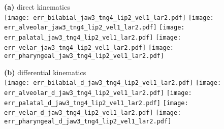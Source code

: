\documentclass[varwidth=7.5in]{standalone}
\begin{document}
\raggedright

{\bf (a)} direct kinematics\\
\texttt{[image: err\_bilabial\_jaw3\_tng4\_lip2\_vel1\_lar2.pdf]}%
\texttt{[image: err\_alveolar\_jaw3\_tng4\_lip2\_vel1\_lar2.pdf]}%
\texttt{[image: err\_palatal\_jaw3\_tng4\_lip2\_vel1\_lar2.pdf]}%
\texttt{[image: err\_velar\_jaw3\_tng4\_lip2\_vel1\_lar2.pdf]}%
\texttt{[image: err\_pharyngeal\_jaw3\_tng4\_lip2\_vel1\_lar2.pdf]}

{\bf (b)} differential kinematics\\
\texttt{[image: err\_bilabial\_d\_jaw3\_tng4\_lip2\_vel1\_lar2.pdf]}%
\texttt{[image: err\_alveolar\_d\_jaw3\_tng4\_lip2\_vel1\_lar2.pdf]}%
\texttt{[image: err\_palatal\_d\_jaw3\_tng4\_lip2\_vel1\_lar2.pdf]}%
\texttt{[image: err\_velar\_d\_jaw3\_tng4\_lip2\_vel1\_lar2.pdf]}%
\texttt{[image: err\_pharyngeal\_d\_jaw3\_tng4\_lip2\_vel1\_lar2.pdf]}
\end{document}
